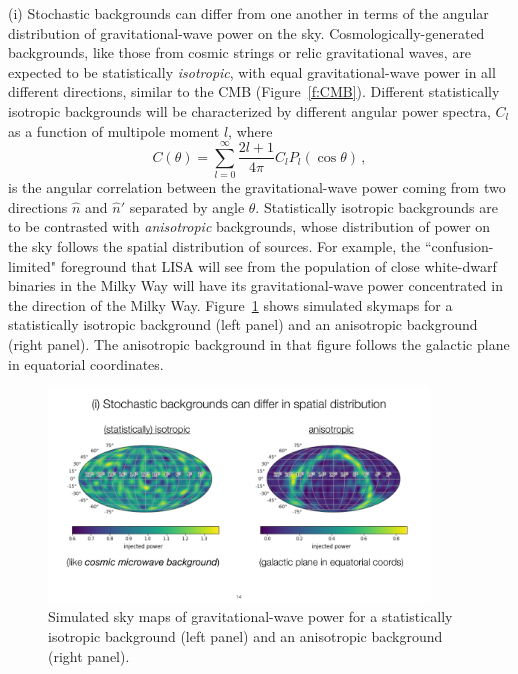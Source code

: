 \documentclass[11pt]{article}
\numberwithin{equation}{section}
\def\be{\begin{equation}}
\def\ee{\end{equation}}
\begin{document}
(i) Stochastic backgrounds can differ from one another 
in terms of the angular distribution of 
gravitational-wave power on the sky.
Cosmologically-generated backgrounds, like those from 
cosmic strings or relic gravitational waves,
are expected to be statistically {\em isotropic},
with equal gravitational-wave power in all different
directions, similar to the CMB (Figure~\ref{f:CMB}).
Different statistically isotropic backgrounds will
be characterized by different angular power spectra,
$C_l$ as a function of multipole moment $l$, where
%
\be
C(\theta) = \sum_{l=0}^\infty \frac{2l+1}{4\pi} 
C_l P_l(\cos\theta)\,,
\ee
%
is the angular correlation between the gravitational-wave
power coming from two directions $\hat n$ and $\hat n'$
separated by angle $\theta$.
Statistically isotropic backgrounds are to be contrasted
with {\em anisotropic} backgrounds, whose distribution of
power on the sky follows the spatial distribution of 
sources.
For example, the ``confusion-limited" foreground that 
LISA will see from the population of close white-dwarf 
binaries in the Milky Way will have its gravitational-wave 
power concentrated in the direction of the Milky Way.
Figure~\ref{f:statiso-vs-aniso} shows simulated skymaps 
for a statistically isotropic background (left panel) and an
anisotropic background (right panel). 
The anisotropic background in that figure follows the
galactic plane in equatorial coordinates. 
%
\begin{figure}[htbp!]
\begin{center}
\includegraphics[width=0.9\textwidth]{Figures/statiso-vs-aniso}
\caption{Simulated sky maps of gravitational-wave power
for a statistically isotropic background (left panel) and an 
anisotropic background (right panel).}
\label{f:statiso-vs-aniso}
\end{center}
\end{figure}
%
\end{document}
